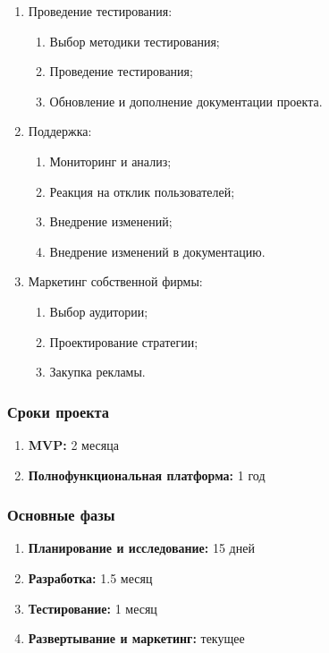 \documentclass[14pt, russian]{matmex-diploma-custom}
\begin{document}
\begin{enumerate}
    \item Проведение тестирования:
    \begin{enumerate}
        \item Выбор методики тестирования;
        \item Проведение тестирования;
        \item Обновление и дополнение документации проекта.
    \end{enumerate}

    \item Поддержка:
    \begin{enumerate}
        \item Мониторинг и анализ;
        \item Реакция на отклик пользователей;
        \item Внедрение изменений;
        \item Внедрение изменений в документацию.
    \end{enumerate}

    \item Маркетинг собственной фирмы:
    \begin{enumerate}
        \item Выбор аудитории;
        \item Проектирование стратегии;
        \item Закупка рекламы.
    \end{enumerate}

\end{enumerate}

\subsubsection{Сроки проекта}
\begin{enumerate}
    \item \textbf{MVP:} 2 месяца
    \item \textbf{Полнофункциональная платформа:} 1 год
\end{enumerate}

\subsubsection{Основные фазы}
\begin{enumerate}
    \item \textbf{Планирование и исследование:} 15 дней
    \item \textbf{Разработка:} 1.5 месяц
    \item \textbf{Тестирование:} 1 месяц
    \item \textbf{Развертывание и маркетинг:} текущее
\end{enumerate}
\end{document}
